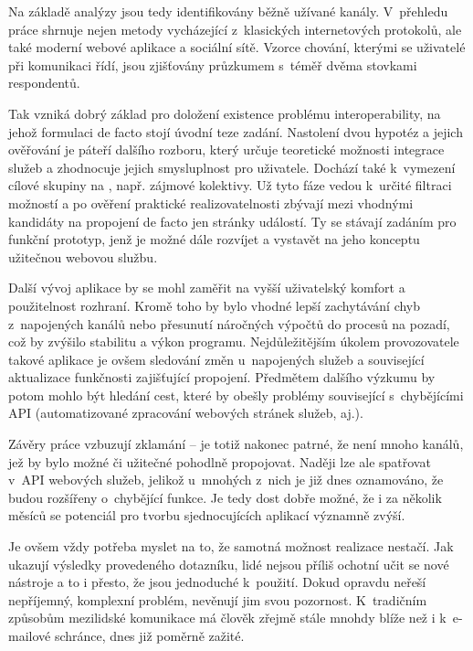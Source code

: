 \documentclass[12pt,oneside,final]{fithesis2}
\begin{document}
Na základě analýzy jsou tedy identifikovány běžně užívané kanály. V~přehledu práce shrnuje nejen metody vycházející z~klasických internetových protokolů, ale také moderní webové aplikace a sociální sítě. Vzorce chování, kterými se uživatelé při komunikaci řídí, jsou zjišťovány průzkumem s~téměř dvěma stovkami respondentů.

Tak vzniká dobrý základ pro doložení existence problému interoperability, na jehož formulaci de facto stojí úvodní teze zadání. Nastolení dvou hypotéz a jejich ověřování je páteří dalšího rozboru, který určuje teoretické možnosti integrace služeb a zhodnocuje jejich smysluplnost pro uživatele. Dochází také k~vymezení cílové skupiny na , např. zájmové kolektivy. Už tyto fáze vedou k~určité filtraci možností a po ověření praktické realizovatelnosti zbývají mezi vhodnými kandidáty na propojení de facto jen stránky událostí. Ty se stávají zadáním pro funkční prototyp, jenž je možné dále rozvíjet a vystavět na jeho konceptu užitečnou webovou službu.

Další vývoj aplikace by se mohl zaměřit na vyšší uživatelský komfort a použitelnost rozhraní. Kromě toho by bylo vhodné lepší zachytávání chyb z~napojených kanálů nebo přesunutí náročných výpočtů do procesů na pozadí, což by zvýšilo stabilitu a výkon programu. Nejdůležitějším úkolem provozovatele takové aplikace je ovšem sledování změn u~napojených služeb a související aktualizace funkčnosti zajišťující propojení. Předmětem dalšího výzkumu by potom mohlo být hledání cest, které by obešly problémy související s~chybějícími API (automatizované zpracování webových stránek služeb, aj.).

Závěry práce vzbuzují zklamání -- je totiž nakonec patrné, že není mnoho kanálů, jež by bylo možné či užitečné pohodlně propojovat. Naději lze ale spatřovat v~API webových služeb, jelikož u~mnohých z~nich je již dnes oznamováno, že budou rozšířeny o~chybějící funkce. Je tedy dost dobře možné, že i za několik měsíců se potenciál pro tvorbu sjednocujících aplikací významně zvýší.

Je ovšem vždy potřeba myslet na to, že samotná možnost realizace nestačí. Jak ukazují výsledky provedeného dotazníku, lidé nejsou příliš ochotní učit se nové nástroje a to i přesto, že jsou jednoduché k~použití. Dokud opravdu neřeší nepříjemný, komplexní problém, nevěnují jim svou pozornost. K~tradičním způsobům mezilidské komunikace má člověk zřejmě stále mnohdy blíže než i k~e-mailové schránce, dnes již poměrně zažité.
\end{document}
